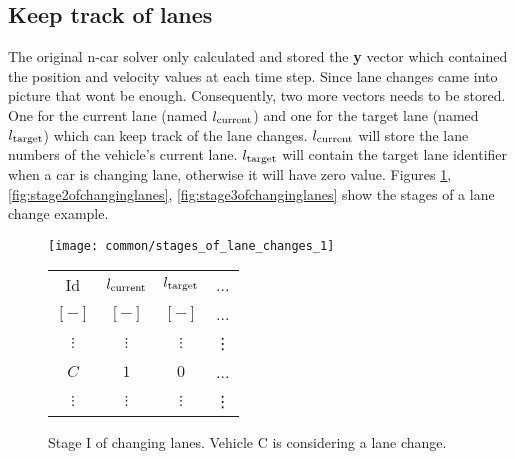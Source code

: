 		\subsection*{Keep track of lanes}
		The original n-car solver only calculated and stored the \textbf{y} vector which contained the position and velocity values at each time step. Since lane changes came into picture that wont be enough. Consequently, two more vectors needs to be stored. One for the current lane (named $l_{\rm current}$) and one for the target lane (named $l_{\rm target}$) which can keep track of the lane changes. $l_{\rm current}$ will store the lane numbers of the vehicle's current lane. $l_{\rm target}$ will contain the target lane identifier when a car is changing lane, otherwise it will have zero value. Figures \ref{fig:stage1ofchanginglanes}, \ref{fig:stage2ofchanginglanes}, \ref{fig:stage3ofchanginglanes} show the stages of a lane change example.
		\begin{figure}
			\begin{center}
				\begin{minipage}{.65\textwidth}
					\texttt{[image: common/stages\_of\_lane\_changes\_1]}
				\end{minipage}\quad
				\begin{minipage}{.3\textwidth}
					\begin{tabular}{ |c|c|c|c| }
						\hline
						Id &  $l_{\rm current}$ & $l_{\rm target}$ & ... \\
						$[-]$ & $[-]$ & $[-]$ & ...\\
						\hline
						$\vdots$ & $\vdots$ & $\vdots$ & \vdots\\
						$C$ & $1$ & $0$ & ...\\
						$\vdots$ & $\vdots$ & $\vdots$ & \vdots\\
						\hline
					\end{tabular}
				\end{minipage}
			\end{center}
			\caption{Stage I of changing lanes. Vehicle C is considering a lane change.}
			\label{fig:stage1ofchanginglanes}
		\end{figure}
